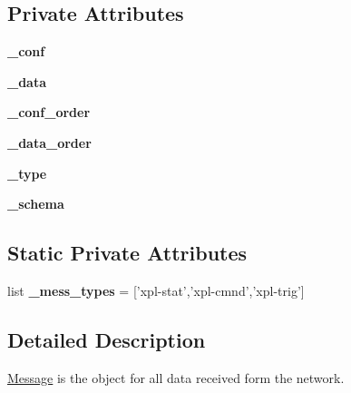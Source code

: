 \subsection*{Private Attributes}
\begin{CompactItemize}
\item 
\hypertarget{classxPLAPI_1_1Message_24328ca4d71be4d24f67d043d1c58f54}{
\textbf{\_\-conf}}
\label{classxPLAPI_1_1Message_24328ca4d71be4d24f67d043d1c58f54}

\item 
\hypertarget{classxPLAPI_1_1Message_29972dfac0cce8db6bd4a6a88adbe817}{
\textbf{\_\-data}}
\label{classxPLAPI_1_1Message_29972dfac0cce8db6bd4a6a88adbe817}

\item 
\hypertarget{classxPLAPI_1_1Message_88e4d23012224e9a9fa6ace6357016cb}{
\textbf{\_\-conf\_\-order}}
\label{classxPLAPI_1_1Message_88e4d23012224e9a9fa6ace6357016cb}

\item 
\hypertarget{classxPLAPI_1_1Message_9b6bd7b6c391434890d4ba996c3cda37}{
\textbf{\_\-data\_\-order}}
\label{classxPLAPI_1_1Message_9b6bd7b6c391434890d4ba996c3cda37}

\item 
\hypertarget{classxPLAPI_1_1Message_d4c56a71254ebbfc52582819bdc0c2d7}{
\textbf{\_\-type}}
\label{classxPLAPI_1_1Message_d4c56a71254ebbfc52582819bdc0c2d7}

\item 
\hypertarget{classxPLAPI_1_1Message_0f504647b076c8e1d4330941ee30f66f}{
\textbf{\_\-schema}}
\label{classxPLAPI_1_1Message_0f504647b076c8e1d4330941ee30f66f}

\end{CompactItemize}
\subsection*{Static Private Attributes}
\begin{CompactItemize}
\item 
\hypertarget{classxPLAPI_1_1Message_cd58199e9068e7351ac49b73675311f5}{
list \textbf{\_\-mess\_\-types} = \mbox{[}'xpl-stat','xpl-cmnd','xpl-trig'\mbox{]}}
\label{classxPLAPI_1_1Message_cd58199e9068e7351ac49b73675311f5}

\end{CompactItemize}


\subsection{Detailed Description}
\hyperlink{classxPLAPI_1_1Message}{Message} is the object for all data received form the network. 

